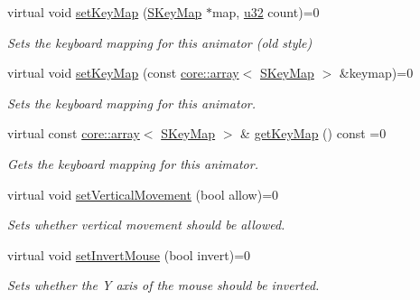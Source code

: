 \begin{DoxyCompactItemize}
virtual void \hyperlink{classirr_1_1scene_1_1ISceneNodeAnimatorCameraFPS_a449aba2c0047f895e417a872505c02ce}{set\+Key\+Map} (\hyperlink{structirr_1_1SKeyMap}{S\+Key\+Map} $\ast$map, \hyperlink{namespaceirr_a0416a53257075833e7002efd0a18e804}{u32} count)=0
\begin{DoxyCompactList}\small\item\em Sets the keyboard mapping for this animator (old style) \end{DoxyCompactList}\item 
virtual void \hyperlink{classirr_1_1scene_1_1ISceneNodeAnimatorCameraFPS_a9a76aeafb9fe79a13b7b128b3eb3b103}{set\+Key\+Map} (const \hyperlink{classirr_1_1core_1_1array}{core\+::array}$<$ \hyperlink{structirr_1_1SKeyMap}{S\+Key\+Map} $>$ \&keymap)=0
\begin{DoxyCompactList}\small\item\em Sets the keyboard mapping for this animator. \end{DoxyCompactList}\item 
\mbox{\label{classirr_1_1scene_1_1ISceneNodeAnimatorCameraFPS_aa3b428a56758529574a14f5d480c2bb7}} 
virtual const \hyperlink{classirr_1_1core_1_1array}{core\+::array}$<$ \hyperlink{structirr_1_1SKeyMap}{S\+Key\+Map} $>$ \& \hyperlink{classirr_1_1scene_1_1ISceneNodeAnimatorCameraFPS_aa3b428a56758529574a14f5d480c2bb7}{get\+Key\+Map} () const =0
\begin{DoxyCompactList}\small\item\em Gets the keyboard mapping for this animator. \end{DoxyCompactList}\item 
virtual void \hyperlink{classirr_1_1scene_1_1ISceneNodeAnimatorCameraFPS_a56cd5340472cc22e08ff17217af8af89}{set\+Vertical\+Movement} (bool allow)=0
\begin{DoxyCompactList}\small\item\em Sets whether vertical movement should be allowed. \end{DoxyCompactList}\item 
virtual void \hyperlink{classirr_1_1scene_1_1ISceneNodeAnimatorCameraFPS_abe634d0c7b03cc6f5adb9df3f04bacd5}{set\+Invert\+Mouse} (bool invert)=0
\begin{DoxyCompactList}\small\item\em Sets whether the Y axis of the mouse should be inverted. \end{DoxyCompactList}\end{DoxyCompactItemize}
